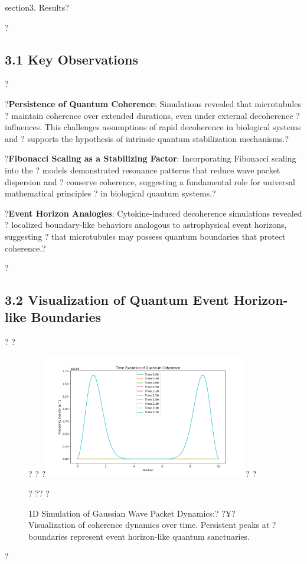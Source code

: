 section{3. Results}?

?\subsection{3.1  Key Observations}?

?\textbf{Persistence of Quantum Coherence}: Simulations revealed that microtubules ?
maintain coherence over extended durations, even under external decoherence ?
influences. This challenges assumptions of rapid decoherence in biological systems and ?
supports the hypothesis of intrinsic quantum stabilization mechanisms.?

?\textbf{Fibonacci Scaling as a Stabilizing Factor}: Incorporating Fibonacci scaling into the ?
models demonstrated resonance patterns that reduce wave packet dispersion and ?
conserve coherence, suggesting a fundamental role for universal mathematical principles ?
in biological quantum systems.?

?\textbf{Event Horizon Analogies}: Cytokine-induced decoherence simulations revealed ?
localized boundary-like behaviors analogous to astrophysical event horizons, suggesting ?
that microtubules may possess quantum boundaries that protect coherence.?


?\subsection{3.2  Visualization of Quantum Event Horizon-like Boundaries}?
?\begin{figure}[H]?
?\centering
?\includegraphics[width=0.8\textwidth]{figures/coherence_evolution_plot.png}?
?\caption{1D Simulation of Gaussian Wave Packet Dynamics:?
	?¥?	Visualization of coherence dynamics over time. Persistent peaks at ?
boundaries represent event horizon-like quantum sanctuaries.}?
?\label{fig 1:1D Simulation of Gaussian Wave Packet Dynamics}?
?\end{figure}?

